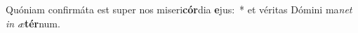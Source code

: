 \item Quóniam confirmáta est super nos miseri\textbf{cór}dia \textbf{e}jus:~* et véritas Dómini ma\textit{net} \textit{in} \textit{æ}\textbf{tér}num.
